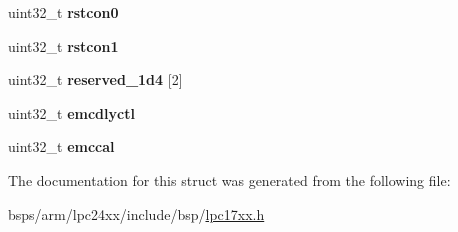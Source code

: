 \begin{DoxyCompactItemize}
uint32\+\_\+t {\bfseries rstcon0}
\item 
\mbox{\label{structlpc17xx__scb_ac3cf7cfd55ce576f50fdedec9e27c591}} 
uint32\+\_\+t {\bfseries rstcon1}
\item 
\mbox{\label{structlpc17xx__scb_a1f83dbc4f2de9db92c574d06fcae722d}} 
uint32\+\_\+t {\bfseries reserved\+\_\+1d4} \mbox{[}2\mbox{]}
\item 
\mbox{\label{structlpc17xx__scb_ab423cd72614bf63ac2721ac43160b79c}} 
uint32\+\_\+t {\bfseries emcdlyctl}
\item 
\mbox{\label{structlpc17xx__scb_a245f9ef80cc0a471883537da3e2cab73}} 
uint32\+\_\+t {\bfseries emccal}
\end{DoxyCompactItemize}


The documentation for this struct was generated from the following file\+:\begin{DoxyCompactItemize}
\item 
bsps/arm/lpc24xx/include/bsp/\mbox{\hyperlink{lpc17xx_8h}{lpc17xx.\+h}}\end{DoxyCompactItemize}
